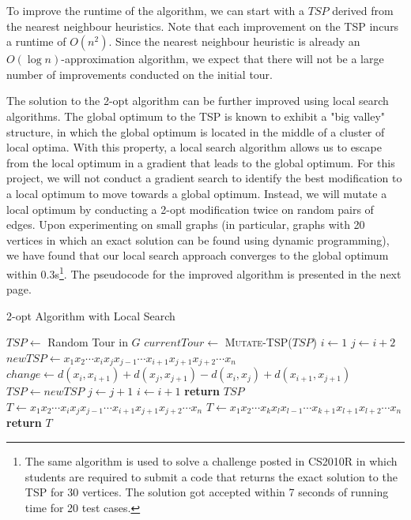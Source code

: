 \documentclass[paper=a4, fontsize=11pt]{scrartcl}	%
\numberwithin{equation}{section}		%
\numberwithin{figure}{section}			%
\numberwithin{table}{section}				%
\begin{document}
To improve the runtime of the algorithm, we can start with a $TSP$ derived from the nearest neighbour heuristics. Note that each improvement on the TSP incurs a runtime of $O(n^2)$. Since the nearest neighbour heuristic is already an $O(\log n)$-approximation algorithm, we expect that there will not be a large number of improvements conducted on the initial tour.

The solution to the 2-opt algorithm can be further improved using local search algorithms. The global optimum to the TSP is known to exhibit a "big valley" structure, in which the global optimum is located in the middle of a cluster of local optima.\cite{boese} With this property, a local search algorithm allows us to escape from the local optimum in a gradient that leads to the global optimum. For this project, we will not conduct a gradient search to identify the best modification to a local optimum to move towards a global optimum. Instead, we will mutate a local optimum by conducting a 2-opt modification twice on random pairs of edges. Upon experimenting on small graphs (in particular, graphs with 20 vertices in which an exact solution can be found using dynamic programming), we have found that our local search approach converges to the global optimum within 0.3s\footnote{The same algorithm is used to solve a challenge posted in CS2010R in which students are required to submit a code that returns the exact solution to the TSP for 30 vertices. The solution got accepted within 7 seconds of running time for 20 test cases.}. The pseudocode for the improved algorithm is presented in the next page.

\begin{algorithm}
\caption{2-opt Algorithm with Local Search}\label{2-opt-local}
\begin{algorithmic}[1]
   \State $TSP \gets $ Random Tour in $G$
   	\State $currentTour \gets$ \textsc{Mutate-TSP}($TSP$)
	\State  $i \gets 1$
	\State  $j \gets i+2$
         \State $newTSP \gets x_1x_2 \cdots x_ix_jx_{j-1} \cdots x_{i+1}x_{j+1}x_{j+2} \cdots x_n$ 
         \State $change \gets  d(x_i, x_{i+1})+d(x_j, x_{j+1}) - d(x_i, x_j) + d(x_{i+1}, x_{j+1})$
         	\State $TSP \gets newTSP$
         \EndIf
         \State $j \gets j+1$
         \EndWhile
\State      $i \gets i+1$
	  \EndWhile
   \EndWhile
   \State \textbf{return} $TSP$
\EndProcedure
\\
 
   \State $T \gets x_1x_2 \cdots x_ix_jx_{j-1} \cdots x_{i+1}x_{j+1}x_{j+2} \cdots x_n$
   \State $T \gets x_1x_2 \cdots x_kx_lx_{l-1} \cdots x_{k+1}x_{l+1}x_{l+2} \cdots x_n$
   \State \textbf{return} $T$
\EndProcedure
\end{algorithmic}
\end{algorithm}
\newpage
\end{document}
